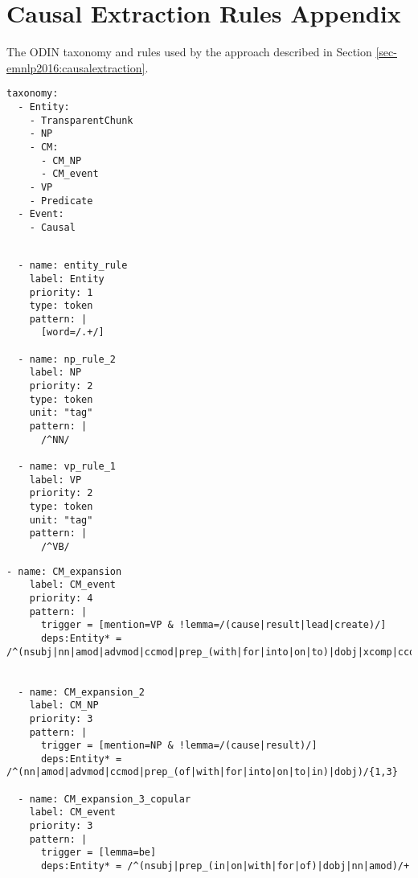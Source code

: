 \chapter{Causal Extraction Rules Appendix \label{appendix:rules}}

The ODIN \citep{valenzuela2016runes} taxonomy and rules used by the approach described in Section \ref{sec-emnlp2016:causalextraction}.  

\begin{singlespace}
\begin{small}

\begin{lstlisting}[label = {lst:tax}, caption = {ODIN taxonomy which provides the hierarchy of extracted entities and events.}]
  taxonomy:
  - Entity:
    - TransparentChunk
    - NP
    - CM:
      - CM_NP
      - CM_event
    - VP
    - Predicate
  - Event:
    - Causal
\end{lstlisting}


\begin{lstlisting}[label={lst:gramm_rules},
caption={Rules for grammatical primatives (e.g. noun phrases, prepositional phrases, etc).  These are used in a later step for finding the causal mentions.}]

  - name: entity_rule
    label: Entity
    priority: 1
    type: token
    pattern: |
      [word=/.+/]

  - name: np_rule_2
    label: NP
    priority: 2
    type: token
    unit: "tag"
    pattern: |
      /^NN/

  - name: vp_rule_1
    label: VP
    priority: 2
    type: token
    unit: "tag"
    pattern: |
      /^VB/
\end{lstlisting}

\begin{lstlisting}[caption={Rules for extracting causal mentions (CMs), which are the potential arguments for causal events.}]
  - name: CM_expansion
    label: CM_event
    priority: 4
    pattern: |
      trigger = [mention=VP & !lemma=/(cause|result|lead|create)/]
      deps:Entity* = /^(nsubj|nn|amod|advmod|ccmod|prep_(with|for|into|on|to)|dobj|xcomp|ccomp|agent|vmod)/{1,3}    


  - name: CM_expansion_2
    label: CM_NP
    priority: 3
    pattern: |
      trigger = [mention=NP & !lemma=/(cause|result)/]
      deps:Entity* = /^(nn|amod|advmod|ccmod|prep_(of|with|for|into|on|to|in)|dobj)/{1,3}   

  - name: CM_expansion_3_copular
    label: CM_event
    priority: 3
    pattern: |
      trigger = [lemma=be]
      deps:Entity* = /^(nsubj|prep_(in|on|with|for|of)|dobj|nn|amod)/+ 



\end{lstlisting}
\end{small}
\end{singlespace}
